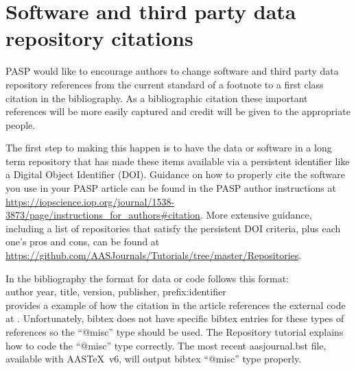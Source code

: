 \documentclass[linenumbers]{aastex631}
\newcommand\aastex{AAS\TeX}
\begin{document}
\section{Software and third party data repository citations} \label{sec:cite}

PASP would like to encourage authors to change software and
third party data repository references from the current standard of a
footnote to a first class citation in the bibliography.  As a bibliographic
citation these important references will be more easily captured and credit
will be given to the appropriate people.

The first step to making this happen is to have the data or software in
a long term repository that has made these items available via a persistent
identifier like a Digital Object Identifier (DOI).  Guidance on how to properly cite the software you use in your PASP article can be found in the PASP author instructions at \break \url{https://iopscience.iop.org/journal/1538-3873/page/instructions_for_authors#citation}. More extensive guidance, including a list of repositories
that satisfy the persistent DOI criteria, plus each one's pros and cons, can be found at \break
\url{https://github.com/AASJournals/Tutorials/tree/master/Repositories}.


In the bibliography the format for data or code follows this format: \\

\noindent author year, title, version, publisher, prefix:identifier\\

\citet{2015ApJ...805...23C} provides a example of how the citation in the
article references the external code at
.  Unfortunately, bibtex does
not have specific bibtex entries for these types of references so the
``@misc'' type should be used.  The Repository tutorial explains how to
code the ``@misc'' type correctly.  The most recent aasjournal.bst file,
available with \aastex\ v6, will output bibtex ``@misc'' type properly.
\end{document}
